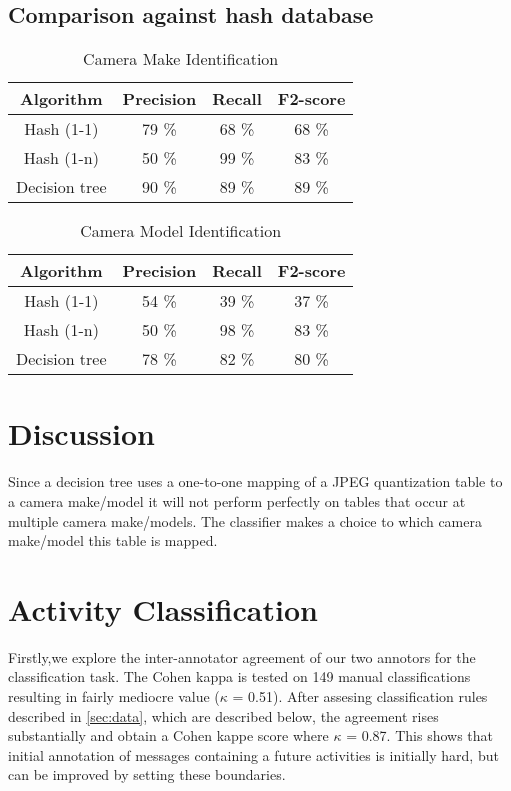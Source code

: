 \subsection{Comparison against hash database}
\begin{table}
\begin{tabular}{| c| c| c| c|}
\hline
Algorithm & Precision & Recall & F2-score\\
\hline
Hash (1-1) & 79 \% & 68 \% & 68 \%\\
Hash (1-n) & 50 \% & 99 \% & 83 \%\\
Decision tree & 90 \% & 89 \% & 89 \% \\
\hline
\end{tabular}
\caption{Camera Make Identification}
\end{table}

\begin{table}

\begin{tabular}{| c| c| c| c|}
\hline
Algorithm & Precision & Recall & F2-score\\
\hline
Hash (1-1) & 54 \% & 39 \% & 37 \%\\
Hash (1-n) & 50 \% & 98 \% & 83 \%\\
Decision tree & 78 \% & 82 \% & 80 \% \\
\hline
\end{tabular}
\caption{Camera Model Identification}

\end{table}

\section{Discussion}

Since a decision tree uses a one-to-one mapping of a JPEG quantization table to a camera make/model it will not perform perfectly on tables that occur at multiple camera make/models. The classifier makes a choice to which camera make/model this table is mapped. 



\iffalse
\section{Activity Classification}\label{sec:res_activity}
Firstly,we explore the inter-annotator agreement of our two annotors for the classification task. The Cohen kappa is tested on 149 manual classifications resulting in fairly mediocre value ($\kappa$ = 0.51). After assesing classification rules described in \autoref{sec:data}, which are described below, the agreement rises substantially and obtain a Cohen kappe score where $\kappa$ = 0.87. This shows that initial annotation of messages containing a future activities is initially hard, but can be improved by setting these boundaries.
 
